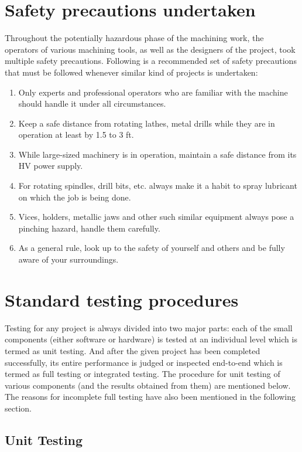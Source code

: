 \section{Safety precautions undertaken}

Throughout the potentially hazardous phase of the machining work, the operators of various machining tools, as well as the designers of the project, took multiple safety precautions. Following is a recommended set of safety precautions that must be followed whenever similar kind of projects is undertaken:

\begin{enumerate}
 \item Only experts and professional operators who are familiar with the machine should handle it under all circumstances.
 \item Keep a safe distance from rotating lathes, metal drills while they are in operation at least by 1.5 to 3 ft.
 \item While large-sized machinery is in operation, maintain a safe distance from its HV power supply.
 \item For rotating spindles, drill bits, etc. always make it a habit to spray lubricant on which the job is being done.
 \item Vices, holders, metallic jaws and other such similar equipment always pose a pinching hazard, handle them carefully.
 \item As a general rule, look up to the safety of yourself and others and be fully aware of your surroundings.
\end{enumerate}

\section{Standard testing procedures}

Testing for any project is always divided into two major parts: each of the small components (either software or hardware) is tested at an individual level which is termed as unit testing. And after the given project has been completed successfully, its entire performance is judged or inspected end-to-end which is termed as full testing or integrated testing. The procedure for unit testing of various components (and the results obtained from them) are mentioned below. The reasons for incomplete full testing have also been mentioned in the following section.

\subsection{Unit Testing}

